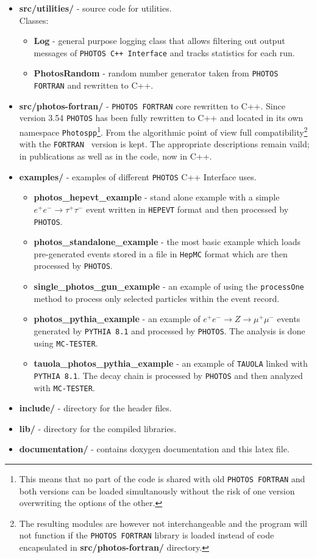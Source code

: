 \documentclass[]{Photos_interface_design}
\begin{document}
\begin{itemize}
\item {\bf src/utilities/ } - source code for utilities.\\
  Classes:
  \begin{itemize}
  \item { \bf Log} - general purpose logging class that allows filtering out output messages 
      of {\tt PHOTOS C++ Interface} and tracks statistics for each run.
  \item { \bf PhotosRandom} - random number generator taken from {\tt PHOTOS FORTRAN} and rewritten to C++.
  \end{itemize}   
\item {\bf src/photos-fortran/ } - {\tt PHOTOS FORTRAN} core rewritten to C++. Since version 3.54 {\tt PHOTOS} has been
      fully rewritten to C++ and located in its own namespace {\tt Photospp}\footnote{This means that no part of
      the code is shared with old {\tt PHOTOS FORTRAN} and both versions can be loaded simultanously without the
      risk of one version overwriting the options of the other.}. From the algorithmic point of view
full compatibility\footnote{The resulting modules are however not interchangeable and the program
 will not function if the {\tt PHOTOS FORTRAN} library is loaded instead of code encapsulated 
in {\bf src/photos-fortran/ } directory.
}
 with the {\tt FORTRAN } version is kept. The appropriate descriptions remain vaild;
in publications as well as in the code, now in C++.
  \item {\bf examples/ } - examples of different {\tt PHOTOS} C++ Interface uses.
    \begin{itemize}
        \item {\bf photos\_hepevt\_example} - stand alone example with a simple 
        $e^+e^- \rightarrow \tau^+\tau^-$ event written in {\tt HEPEVT} format
         and then processed by {\tt PHOTOS}.
	\item {\bf photos\_standalone\_example} - the most basic example which loads pre-generated 
	      events stored in a file in {\tt HepMC} format which are then processed by {\tt PHOTOS}.
	\item {\bf single\_photos\_gun\_example} - an example of using the {\tt processOne} method
	      to process only selected particles within the event record.
    \item {\bf photos\_pythia\_example} - an example of $e^+e^- \rightarrow Z \rightarrow \mu^+\mu^-$ events
	generated by {\tt PYTHIA 8.1} and processed by {\tt PHOTOS}. The analysis is done using {\tt MC-TESTER}.
    \item {\bf tauola\_photos\_pythia\_example } - an example of  {\tt TAUOLA} linked with {\tt PYTHIA 8.1}.
	The decay chain is processed by {\tt PHOTOS} and then analyzed with {\tt MC-TESTER}.
    \end{itemize}   
  \item {\bf include/} - directory for the header files.
  \item {\bf lib/ } - directory for the compiled  libraries. 
  \item {\bf documentation/ } - contains doxygen documentation and this latex file.
\end{itemize}
\end{document}
